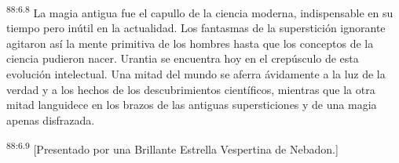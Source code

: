 \par
\textsuperscript{88:6.8} La magia antigua fue el capullo de la ciencia moderna, indispensable en su tiempo pero inútil en la actualidad. Los fantasmas de la superstición ignorante agitaron así la mente primitiva de los hombres hasta que los conceptos de la ciencia pudieron nacer. Urantia se encuentra hoy en el crepúsculo de esta evolución intelectual. Una mitad del mundo se aferra ávidamente a la luz de la verdad y a los hechos de los descubrimientos científicos, mientras que la otra mitad languidece en los brazos de las antiguas supersticiones y de una magia apenas disfrazada.

\par
\textsuperscript{88:6.9} [Presentado por una Brillante Estrella Vespertina de Nebadon.]
